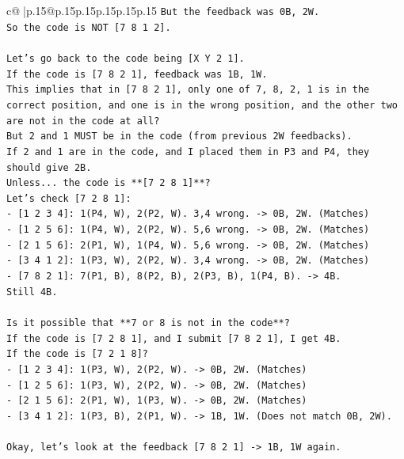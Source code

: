 \documentclass{article}
\begin{document}
{\begin{supertabular}{c@{$\;$}|p{.15\linewidth}@{}p{.15\linewidth}p{.15\linewidth}p{.15\linewidth}p{.15\linewidth}p{.15\linewidth}}
{{{\texttt{But the feedback was 0B, 2W.} \\
\texttt{So the code is NOT {[}7 8 1 2{]}.} \\
\\ 
\texttt{Let's go back to the code being {[}X Y 2 1{]}.} \\
\texttt{If the code is {[}7 8 2 1{]}, feedback was 1B, 1W.} \\
\texttt{This implies that in {[}7 8 2 1{]}, only one of 7, 8, 2, 1 is in the correct position, and one is in the wrong position, and the other two are not in the code at all?} \\
\texttt{But 2 and 1 MUST be in the code (from previous 2W feedbacks).} \\
\texttt{If 2 and 1 are in the code, and I placed them in P3 and P4, they should give 2B.} \\
\texttt{Unless... the code is **{[}7 2 8 1{]}**?} \\
\texttt{Let's check {[}7 2 8 1{]}:} \\
\texttt{{-} {[}1 2 3 4{]}: 1(P4, W), 2(P2, W). 3,4 wrong. {-}> 0B, 2W. (Matches)} \\
\texttt{{-} {[}1 2 5 6{]}: 1(P4, W), 2(P2, W). 5,6 wrong. {-}> 0B, 2W. (Matches)} \\
\texttt{{-} {[}2 1 5 6{]}: 2(P1, W), 1(P4, W). 5,6 wrong. {-}> 0B, 2W. (Matches)} \\
\texttt{{-} {[}3 4 1 2{]}: 1(P3, W), 2(P2, W). 3,4 wrong. {-}> 0B, 2W. (Matches)} \\
\texttt{{-} {[}7 8 2 1{]}: 7(P1, B), 8(P2, B), 2(P3, B), 1(P4, B). {-}> 4B.} \\
\texttt{Still 4B.} \\
\\ 
\texttt{Is it possible that **7 or 8 is not in the code**?} \\
\texttt{If the code is {[}7 2 8 1{]}, and I submit {[}7 8 2 1{]}, I get 4B.} \\
\texttt{If the code is {[}7 2 1 8{]}?} \\
\texttt{{-} {[}1 2 3 4{]}: 1(P3, W), 2(P2, W). {-}> 0B, 2W. (Matches)} \\
\texttt{{-} {[}1 2 5 6{]}: 1(P3, W), 2(P2, W). {-}> 0B, 2W. (Matches)} \\
\texttt{{-} {[}2 1 5 6{]}: 2(P1, W), 1(P3, W). {-}> 0B, 2W. (Matches)} \\
\texttt{{-} {[}3 4 1 2{]}: 1(P3, B), 2(P1, W). {-}> 1B, 1W. (Does not match 0B, 2W).} \\
\\ 
\texttt{Okay, let's look at the feedback {[}7 8 2 1{]} {-}> 1B, 1W again.} \\
}}}
\end{supertabular}}
\end{document}
